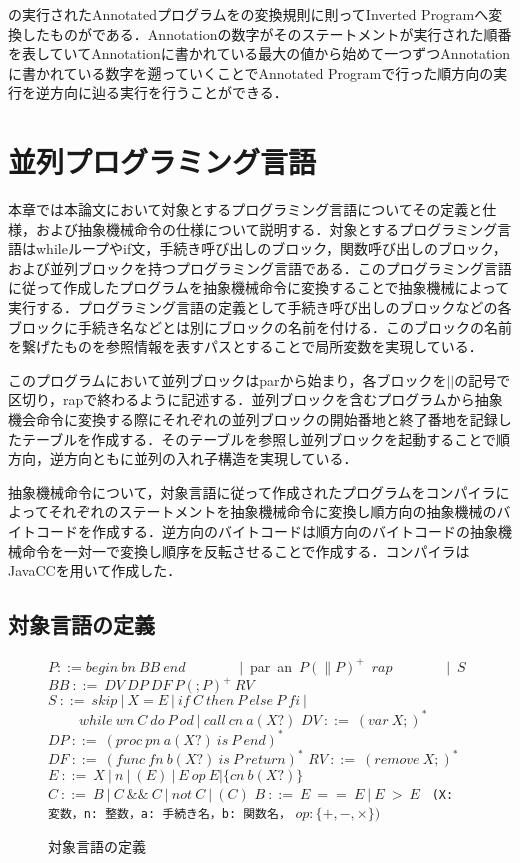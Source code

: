 \documentclass[submit,PRO]{ipsj}
\def\|{\verb|}
\begin{document}
の実行されたAnnotatedプログラムをの変換規則に則ってInverted Programへ変換したものがである．Annotationの数字がそのステートメントが実行された順番を表していてAnnotationに書かれている最大の値から始めて一つずつAnnotationに書かれている数字を遡っていくことでAnnotated Programで行った順方向の実行を逆方向に辿る実行を行うことができる．

%3
\section{並列プログラミング言語}

本章では本論文において対象とするプログラミング言語についてその定義と仕様，および抽象機械命令の仕様について説明する．対象とするプログラミング言語はwhileループやif文，手続き呼び出しのブロック，関数呼び出しのブロック，および並列ブロックを持つプログラミング言語である．このプログラミング言語に従って作成したプログラムを抽象機械命令に変換することで抽象機械によって実行する．プログラミング言語の定義として手続き呼び出しのブロックなどの各ブロックに手続き名などとは別にブロックの名前を付ける．このブロックの名前を繋げたものを参照情報を表すパスとすることで局所変数を実現している．

このプログラムにおいて並列ブロックはparから始まり，各ブロックを$||$の記号で区切り，rapで終わるように記述する．並列ブロックを含むプログラムから抽象機会命令に変換する際にそれぞれの並列ブロックの開始番地と終了番地を記録したテーブルを作成する．そのテーブルを参照し並列ブロックを起動することで順方向，逆方向ともに並列の入れ子構造を実現している．

抽象機械命令について，対象言語に従って作成されたプログラムをコンパイラによってそれぞれのステートメントを抽象機械命令に変換し順方向の抽象機械のバイトコードを作成する．逆方向のバイトコードは順方向のバイトコードの抽象機械命令を一対一で変換し順序を反転させることで作成する．コンパイラはJavaCCを用いて作成した．

\subsection{対象言語の定義}
\label{sec:3.1}

\begin{figure}[tb]
\vbox{
\hbox{$P ::= begin\ bn\ BB\ end$}
\hbox{\ \ \ \ \ \ \ $|$ par an $P(\parallel P)^+$ $rap$}
\hbox{\ \ \ \ \ \ \ $|$ $S$}
\hbox{$BB\ ::=\ DV\ DP\ DF\ P(;P)^+\ RV$}
\hbox{$S\ ::=\ skip\ |\  X = E\ |\ if\ C\ then\ P\ else\ P\ fi\ |$}
\hbox{$\ \ \ \ \ \ \ \ \ \  while\ wn\ C\ do\ P\ od\ |\ call\ cn\ a(X?)$}
\hbox{$DV\ ::=\ (var\ X;)^*$}
\hbox{$DP\ ::=\ (proc\ pn\ a(X?)\ is\ P\ end)^*$}
\hbox{$DF\ ::=\ (func\ fn\ b(X?)\ is\ P\ return)^*$}
\hbox{$RV\ ::=\ (remove\ X;)^*$}
\hbox{$E\ ::=\ X\ |\ n\ |\ (E)\ |\ E\ op\ E | \{cn\ b(X?)\}$}
\hbox{$C\ ::=\ B\ |\ C\ \&\& \ C\ |\ not\ C\ |\ (C)$}
\hbox{$B\ ::=\ E\ ==\ E\ |\ E\ >\ E$}
\hbox{\\}
\hbox{\| (X: 変数，n: 整数，a: 手続き名，b: 関数名，|}
\hbox{$op: \{+,-,\times \})$}
}
\centerline{}
\caption{対象言語の定義}
\label{fig:def}
\end{figure}
\end{document}
